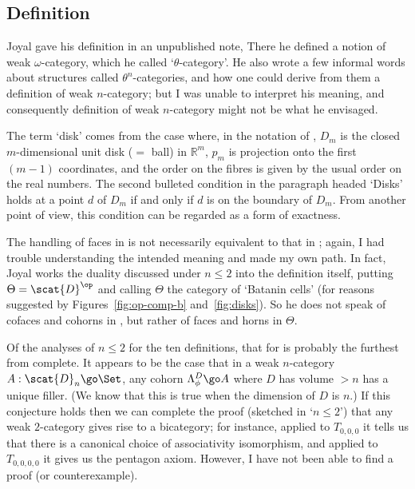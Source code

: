 \subsection*{Definition }

Joyal gave his definition in an unpublished note,
% 
%
% 
There he defined a notion of weak $\omega$-category, which he called
`$\theta$-category'.  He also wrote a few informal words about structures
called $\theta^n$-categories, and how one could derive from them a definition
of weak $n$-category; but I was unable to interpret his meaning, and
consequently definition  of weak $n$-category might not be what
he envisaged.

The term `disk' comes from the case where, in the notation of , $D_m$
is the closed $m$-dimensional unit disk ($=$ ball) in $\mathbb{R}^m$, $p_m$
is projection onto the first $(m-1)$ coordinates, and the order on the fibres
is given by the usual order on the real numbers.  The second bulleted
condition in the paragraph headed `Disks' holds at a point $d$ of $D_m$ if
and only if $d$ is on the boundary of $D_m$.  From another point of view,
this condition can be regarded as a form of exactness.

The handling of faces in  is not necessarily equivalent to that in
; again, I had trouble understanding the intended meaning and made
my own path.  In fact, Joyal works the duality discussed under $n\leq 2$ into
the definition itself, putting $\Theta = \scat{D}^\op$ and calling $\Theta$
the category of `Batanin cells' (for reasons suggested by
Figures~\ref{fig:op-comp-b} and~\ref{fig:disks}).  So he does not speak of
cofaces and cohorns in , but rather of faces and horns in $\Theta$.

Of the analyses of $n\leq 2$ for the ten definitions, that for  is
probably the furthest from complete.  It appears to be the case that in a
weak $n$-category $A: \scat{D}_n \go \Set$, any cohorn $\Lambda^D_\phi \go A$
where $D$ has volume $>n$ has a unique filler.  (We know that this is true
when the dimension of $D$ is $n$.)  If this conjecture holds then we can
complete the proof (sketched in `$n\leq 2$') that any weak $2$-category gives
rise to a bicategory; for instance, applied to $T_{0,0,0}$ it tells us that
there is a canonical choice of associativity isomorphism, and applied to
$T_{0,0,0,0}$ it gives us the pentagon axiom.  However, I have not been able
to find a proof (or counterexample).

